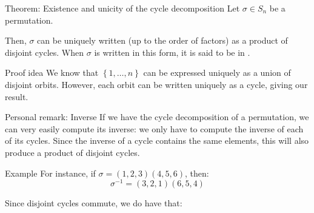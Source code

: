 \documentclass[a4paper]{article}
\begin{document}
\begin{parag}{Theorem: Existence and unicity of the cycle decomposition}
    Let $\sigma \in S_n$ be a permutation.

    Then, $\sigma$ can be uniquely written (up to the order of factors) as a product of disjoint cycles. When $\sigma$ is written in this form, it is said to be in .

    \begin{subparag}{Proof idea}
        We know that $\left\{1, \ldots, n\right\}$ can be expressed uniquely as a union of disjoint orbits. However, each orbit can be written uniquely as a cycle, giving our result.
    \end{subparag}
\end{parag}

\begin{parag}{Personal remark: Inverse}
    If we have the cycle decomposition of a permutation, we can very easily compute its inverse: we only have to compute the inverse of each of its cycles. Since the inverse of a cycle contains the same elements, this will also produce a product of disjoint cycles.

    \begin{subparag}{Example}
        For instance, if $\sigma = \left(1, 2, 3\right)\left(4, 5, 6\right)$, then: 
        \[\sigma^{-1} = \left(3, 2, 1\right)\left(6, 5, 4\right)\]

        Since disjoint cycles commute, we do have that: 
    \end{subparag}
\end{parag}
\end{document}
